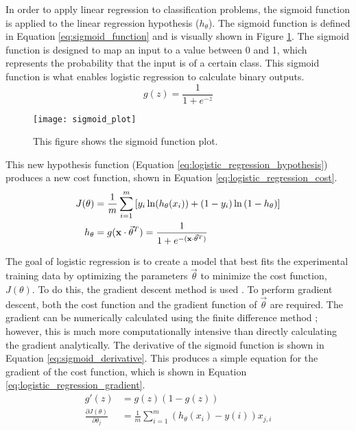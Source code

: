 In order to apply linear regression to classification problems, the sigmoid function is applied to the linear regression hypothesis ($h_{\theta}$).  The sigmoid function is defined in Equation \ref{eq:sigmoid_function} and is visually shown in Figure \ref{fig:sigmoid_plot}.  The sigmoid function is designed to map an input to a value between 0 and 1, which represents the probability that the input is of a certain class.  This sigmoid function is what enables logistic regression to calculate binary outputs.
\begin{equation} \label{eq:sigmoid_function}
	g(z) = \frac{1}{1+e^{-z}}
\end{equation}

\begin{figure}
	\centering
	\texttt{[image: sigmoid\_plot]}
	\decoRule
	\caption{This figure shows the sigmoid function plot.}
	\label{fig:sigmoid_plot}
\end{figure}

This new hypothesis function (Equation \ref{eq:logistic_regression_hypothesis}) produces a new cost function, shown in Equation \ref{eq:logistic_regression_cost}.
\begin{align}
	J(\theta) &= \frac{1}{m} \sum_{i=1}^{m}{\left[y_i \ln({h_{\theta}(x_i))} + (1-y_i) \ln{(1-h_{\theta}}) \right]}  \label{eq:logistic_regression_cost} \\
	h_{\theta} &= g(\mathbf{x} \cdot \vec{\theta}^T) = \frac{1}{1+e^{-(\mathbf{x} \cdot \vec{\theta}^T)}} \label{eq:logistic_regression_hypothesis}
\end{align}

The goal of logistic regression is to create a model that best fits the experimental training data by optimizing the parameters $\vec{\theta}$ to minimize the cost function, $J(\theta)$.  To do this, the gradient descent method is used \cite{gradient_descent}.  To  perform gradient descent, both the cost function and the gradient function of $\vec{\theta}$ are required.  The gradient can be numerically calculated using the finite difference method \cite{finite_difference_method}; however, this is much more computationally intensive than directly calculating the gradient analytically.  The derivative of the sigmoid function is shown in Equation \ref{eq:sigmoid_derivative}.  This produces a simple equation for the gradient of the cost function, which is shown in Equation \ref{eq:logistic_regression_gradient}.
\begin{align}
	g\prime(z) &= g(z) (1-g(z)) \label{eq:sigmoid_derivative} \\
	\frac{\partial J(\theta)}{\partial \theta_j} &= \frac{1}{m} \sum_{i=1}^{m}{\left(h_{\theta}(x_i) - y(i)\right) x_{j,i}} \label{eq:logistic_regression_gradient}
\end{align}

